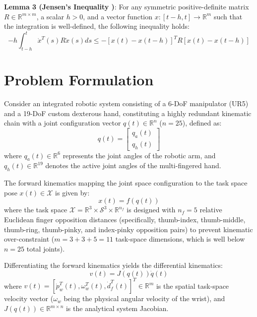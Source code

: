 \documentclass[letterpaper,journal]{IEEEtran}
\begin{document}
\textbf{Lemma 3 (Jensen's Inequality \cite{ref_tcs_haptic})}: For any symmetric positive-definite matrix $R \in \mathbb{R}^{m \times m}$, a scalar $h > 0$, and a vector function $x: [t-h, t] \to \mathbb{R}^m$ such that the integration is well-defined, the following inequality holds:
\begin{equation}
-h \int_{t-h}^{t} \dot{x}^T(s) R \dot{x}(s) ds \le - [x(t) - x(t-h)]^T R [x(t) - x(t-h)]
\end{equation}

\section{Problem Formulation}

Consider an integrated robotic system consisting of a 6-DoF manipulator (UR5) and a 19-DoF custom dexterous hand, constituting a highly redundant kinematic chain with a joint configuration vector $q(t) \in \mathbb{R}^n$ ($n = 25$), defined as:
\begin{equation}
q(t) = \begin{bmatrix} q_a(t) \\ q_h(t) \end{bmatrix}
\end{equation}
where $q_a(t) \in \mathbb{R}^6$ represents the joint angles of the robotic arm, and $q_h(t) \in \mathbb{R}^{19}$ denotes the active joint angles of the multi-fingered hand. 

The forward kinematics mapping the joint space configuration to the task space pose $x(t) \in \mathcal{X}$ is given by:
\begin{equation}
x(t) = f(q(t))
\end{equation}
where the task space $\mathcal{X} = \mathbb{R}^3 \times \mathcal{S}^3 \times \mathbb{R}^{n_f}$ is designed with $n_f = 5$ relative Euclidean finger opposition distances (specifically, thumb-index, thumb-middle, thumb-ring, thumb-pinky, and index-pinky opposition pairs) to prevent kinematic over-constraint ($m = 3 + 3 + 5 = 11$ task-space dimensions, which is well below $n = 25$ total joints). 

Differentiating the forward kinematics yields the differential kinematics:
\begin{equation}
v(t) = J(q(t))\dot{q}(t)
\end{equation}
where $v(t) = [\dot{p}_w^T(t), \omega_w^T(t), \dot{d}_f^T(t)]^T \in \mathbb{R}^m$ is the spatial task-space velocity vector ($\omega_w$ being the physical angular velocity of the wrist), and $J(q(t)) \in \mathbb{R}^{m \times n}$ is the analytical system Jacobian.
\end{document}
